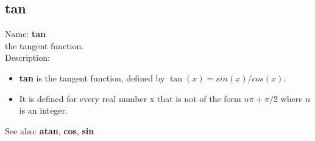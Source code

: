 \subsection{ tan }
\noindent Name: \textbf{tan}\\
the tangent function.\\

\noindent Description: \begin{itemize}

\item \textbf{tan} is the tangent function, defined by $\tan(x) = sin(x)/cos(x)$.

\item It is defined for every real number x that is not of the form $n\pi + \pi/2$ where $n$ is an integer.
\end{itemize}
See also: \textbf{atan}, \textbf{cos}, \textbf{sin}
